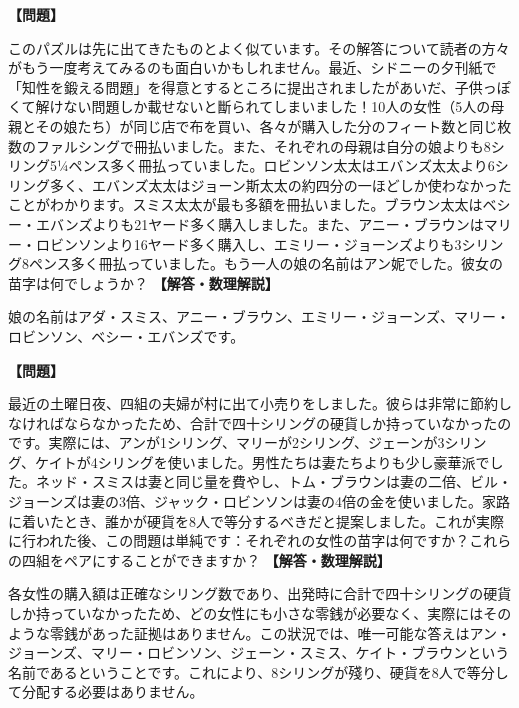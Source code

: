 \documentclass[10pt,a4paper,oneside,openany]{ltjsbook}
\begin{document}
\begin{tcolorbox}[colback=softblue,colframe=primaryblue,title=\textbf{第 140 問：アダの苗字は？ （原題: FIND ADA'S SURNAME.）},arc=2mm,boxrule=1pt,breakable]
\textbf{【問題】}\par\vspace{0.3em}
このパズルは先に出てきたものとよく似ています。その解答について読者の方々がもう一度考えてみるのも面白いかもしれません。最近、シドニーの夕刊紙で「知性を鍛える問題」を得意とするところに提出されましたがあいだ、子供っぽくて解けない問題しか載せないと斷られてしまいました！10人の女性（5人の母親とその娘たち）が同じ店で布を買い、各々が購入した分のフィート数と同じ枚数のファルシングで冊払いました。また、それぞれの母親は自分の娘よりも8シリング5¼ペンス多く冊払っていました。ロビンソン太太はエバンズ太太より6シリング多く、エバンズ太太はジョーン斯太太の約四分の一ほどしか使わなかったことがわかります。スミス太太が最も多額を冊払いました。ブラウン太太はベシー・エバンズよりも21ヤード多く購入しました。また、アニー・ブラウンはマリー・ロビンソンより16ヤード多く購入し、エミリー・ジョーンズよりも3シリング8ペンス多く冊払っていました。もう一人の娘の名前はアン妮でした。彼女の苗字は何でしょうか？
\tcblower
\textbf{【解答・数理解説】}\par\vspace{0.3em}
娘の名前はアダ・スミス、アニー・ブラウン、エミリー・ジョーンズ、マリー・ロビンソン、ベシー・エバンズです。
\end{tcolorbox}

\begin{tcolorbox}[colback=softblue,colframe=primaryblue,title=\textbf{第 141 問：土曜日のマーケティング （原題: SATURDAY MARKETING.）},arc=2mm,boxrule=1pt,breakable]
\textbf{【問題】}\par\vspace{0.3em}
最近の土曜日夜、四組の夫婦が村に出て小売りをしました。彼らは非常に節約しなければならなかったため、合計で四十シリングの硬貨しか持っていなかったのです。実際には、アンが1シリング、マリーが2シリング、ジェーンが3シリング、ケイトが4シリングを使いました。男性たちは妻たちよりも少し豪華派でした。ネッド・スミスは妻と同じ量を費やし、トム・ブラウンは妻の二倍、ビル・ジョーンズは妻の3倍、ジャック・ロビンソンは妻の4倍の金を使いました。家路に着いたとき、誰かが硬貨を8人で等分するべきだと提案しました。これが実際に行われた後、この問題は単純です：それぞれの女性の苗字は何ですか？これらの四組をペアにすることができますか？
\tcblower
\textbf{【解答・数理解説】}\par\vspace{0.3em}
各女性の購入額は正確なシリング数であり、出発時に合計で四十シリングの硬貨しか持っていなかったため、どの女性にも小さな零銭が必要なく、実際にはそのような零銭があった証拠はありません。この狀況では、唯一可能な答えはアン・ジョーンズ、マリー・ロビンソン、ジェーン・スミス、ケイト・ブラウンという名前であるということです。これにより、8シリングが殘り、硬貨を8人で等分して分配する必要はありません。
\end{tcolorbox}
\end{document}
